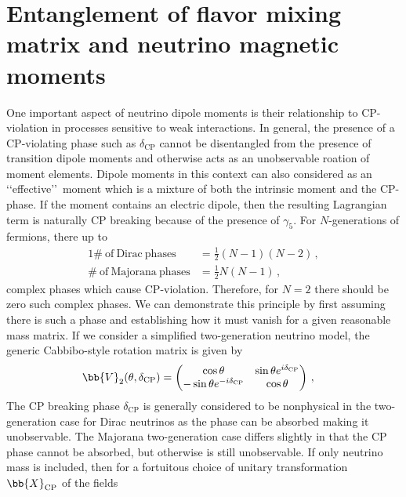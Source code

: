 \section{Entanglement of flavor mixing matrix and neutrino magnetic moments}
\noindent One important aspect of neutrino dipole moments is their relationship to CP-violation in processes sensitive to weak interactions. In general, the presence of a CP-violating phase such as $\delta_{\mathrm{CP}}$ cannot be disentangled from the presence of transition dipole moments and otherwise acts as an unobservable roation of moment elements. Dipole moments in this context can also considered as an \lq\lq effective\rq\rq\ moment which is a mixture of both the intrinsic moment and the CP-phase. If the moment contains an electric dipole, then the resulting Lagrangian term is naturally CP breaking because of the presence of $\gamma_{5}$. For $N$-generations of fermions, there up to
\begin{alignat}{1}
	\label{cp:eq:01a} \#\ \mathrm{of}\ \mathrm{Dirac}\ \mathrm{phases} &= \frac{1}{2}(N-1)(N-2)\,,\\
	\label{cp:eq:01b} \#\ \mathrm{of}\ \mathrm{Majorana}\ \mathrm {phases} &= \frac{1}{2}N(N-1)\,,
\end{alignat}
complex phases which cause CP-violation. Therefore, for $N=2$ there should be zero such complex phases. We can demonstrate this principle by first assuming there is such a phase and establishing how it must vanish for a given reasonable mass matrix. If we consider a simplified two-generation neutrino model, the generic Cabbibo-style rotation matrix is given by
\begin{alignat}{1}
	\label{cp:eq:02} \bb{V}_{2}(\theta,\delta_{\mathrm{CP}}) &= 
	\begin{pmatrix}
		\cos{\theta}& \sin{\theta}e^{i\delta_{\mathrm{CP}}} \\
		-\sin{\theta}e^{-i\delta_{\mathrm{CP}}} & \cos{\theta}
	\end{pmatrix}\,,
\end{alignat}
The CP breaking phase $\delta_{\mathrm{CP}}$ is generally considered to be nonphysical in the two-generation case for Dirac neutrinos as the phase can be absorbed making it unobservable. The Majorana two-generation case differs slightly in that the CP phase cannot be absorbed, but otherwise is still unobservable. If only neutrino mass is included, then for a fortuitous choice of unitary transformation $\bb{X}_{\mathrm{CP}}$ of the fields
